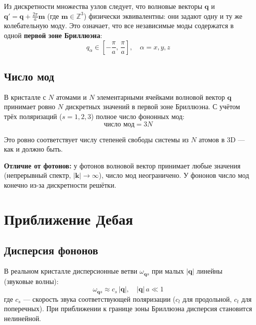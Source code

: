 \documentclass[../general/general]{subfiles}
\begin{document}
Из дискретности множества узлов следует, что волновые векторы $\mathbf{q}$ и $\mathbf{q}' = \mathbf{q} + \frac{2\pi}{a}\mathbf{m}$ (где $\mathbf{m} \in \mathbb{Z}^3$) физически эквивалентны: они задают одну и ту же колебательную моду. Это означает, что все независимые моды содержатся в одной \textbf{первой зоне Бриллюэна}:
\begin{equation}
    q_\alpha \in \left[-\frac{\pi}{a},\,\frac{\pi}{a}\right], \quad \alpha = x,y,z
\end{equation}

\subsection{Число мод}

В кристалле с $N$ атомами и $N$ элементарными ячейками волновой вектор $\mathbf{q}$ принимает ровно $N$ дискретных значений в первой зоне Бриллюэна. С учётом трёх поляризаций ($s = 1, 2, 3$) полное число фононных мод:
\begin{equation}
    \boxed{\text{число мод} = 3N}
    \label{eq:num_modes}
\end{equation}

Это ровно соответствует числу степеней свободы системы из $N$ атомов в 3D --- как и должно быть.

\textbf{Отличие от фотонов:} у фотонов волновой вектор принимает любые значения (непрерывный спектр, $|\mathbf{k}| \to \infty$), число мод неограничено. У фононов число мод конечно из-за дискретности решётки.



\section{Приближение Дебая}

\subsection{Дисперсия фононов}

В реальном кристалле дисперсионные ветви $\omega_{\mathbf{q}s}$ при малых $|\mathbf{q}|$ линейны (звуковые волны):
\begin{equation}
    \omega_{\mathbf{q}s} \approx c_s\,|\mathbf{q}|, \quad |\mathbf{q}|\,a \ll 1
\end{equation}
где $c_s$ --- скорость звука соответствующей поляризации ($c_l$ для продольной, $c_t$ для поперечных). При приближении к границе зоны Бриллюэна дисперсия становится нелинейной.
\end{document}
